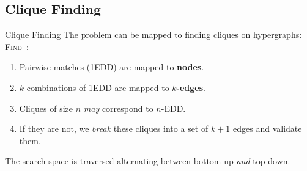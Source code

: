 \documentclass[10pt]{beamer}
\begin{document}
\subsection{Clique Finding}
\begin{frame}{Clique Finding}
    The problem can be mapped to finding cliques on hypergraphs: \textsc{Find}~\cite{koeller2003discovery}:
    
    \begin{enumerate}
        \item Pairwise matches (1EDD) are mapped to \textbf{nodes}.
        \item $k$-combinations of 1EDD are mapped to \textbf{$k$-edges}.
        \item Cliques of size $n$ \emph{may} correspond to $n$-EDD.
        \item If they are not, we \emph{break} these cliques into a set of $k+1$ edges and
            validate them.
    \end{enumerate}

    The search space is traversed alternating between bottom-up \emph{and} top-down.
\end{frame}
\end{document}
